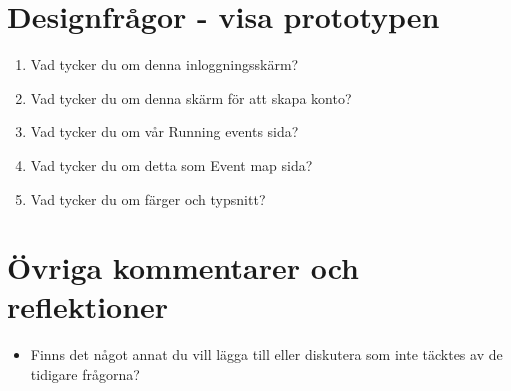 \documentclass{article}
\begin{document}
\section*{Designfrågor - visa prototypen}
\begin{enumerate}[label=\textbf{Fråga \arabic*:}]
    \item Vad tycker du om denna inloggningsskärm?
        \vspace{2cm}
    \item Vad tycker du om denna skärm för att skapa konto?
        \vspace{2cm}
    \item Vad tycker du om vår Running events sida?
        \vspace{2cm}
    \item Vad tycker du om detta som Event map sida?
        \vspace{2cm}
    \item Vad tycker du om färger och typsnitt?
        \vspace{2cm}
\end{enumerate}

\section*{Övriga kommentarer och reflektioner}
\begin{itemize}[label=]
    \item Finns det något annat du vill lägga till eller diskutera som inte täcktes av de tidigare frågorna?
\end{itemize}
\thispagestyle{empty}
\end{document}
